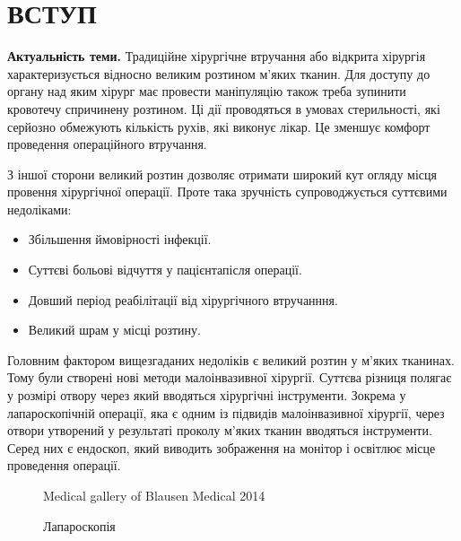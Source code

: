 \chapter{ВСТУП}

\nocite{bahvalov-et-al,benerdge-et-al} 

\textbf{Актуальність теми.} Традиційне хірургічне втручання або відкрита хірургія характеризується відносно великим
розтином м'яких тканин. Для доступу до органу над яким хірург має провести маніпуляцію також треба зупинити кровотечу
спричинену розтином. Ці дії проводяться в умовах стерильності, які серйозно обмежують кількість рухів, які виконує
лікар. Це зменшує комфорт проведення операційного втручання.

З іншої сторони великий розтин дозволяє отримати широкий кут огляду місця провення хірургічної операції. Проте така 
зручність супроводжується суттєвими недоліками:
\begin{itemize}
  \item Збільшення ймовірності інфекції.
  \item Суттєві больові відчуття у пацієнта після операції.
  \item Довший період реабілітації від хірургічного втручанння.
  \item Великий шрам у місці розтину.
\end{itemize}

Головним фактором вищезгаданих недоліків є великий розтин у м'яких тканинах. Тому були створені нові методи 
малоінвазивної хірургії. Суттєва різниця полягає у розмірі отвору через який вводяться хірургічні інструменти. 
Зокрема у лапароскопічній операції, яка є одним із підвидів малоінвазивної хірургії, через отвори утворений у результаті 
проколу м'яких тканин вводяться інструменти. Серед них є ендоскоп, який виводить зображення на монітор і освітлює місце 
проведення операції.

\begin{figure}[ht!]
  \centering
    {Medical gallery of Blausen Medical 2014}
  \caption{Лапароскопія}
  \label{fig:intro_laparoscopy}
\end{figure}

